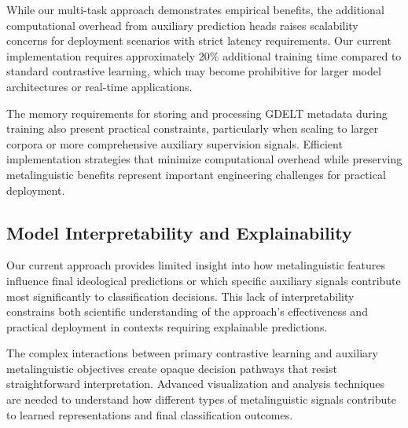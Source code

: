 While our multi-task approach demonstrates empirical benefits, the additional computational overhead from auxiliary prediction heads raises scalability concerns for deployment scenarios with strict latency requirements. Our current implementation requires approximately 20\% additional training time compared to standard contrastive learning, which may become prohibitive for larger model architectures or real-time applications.

The memory requirements for storing and processing GDELT metadata during training also present practical constraints, particularly when scaling to larger corpora or more comprehensive auxiliary supervision signals. Efficient implementation strategies that minimize computational overhead while preserving metalinguistic benefits represent important engineering challenges for practical deployment.

\subsection{Model Interpretability and Explainability}

Our current approach provides limited insight into how metalinguistic features influence final ideological predictions or which specific auxiliary signals contribute most significantly to classification decisions. This lack of interpretability constrains both scientific understanding of the approach's effectiveness and practical deployment in contexts requiring explainable predictions.

The complex interactions between primary contrastive learning and auxiliary metalinguistic objectives create opaque decision pathways that resist straightforward interpretation. Advanced visualization and analysis techniques are needed to understand how different types of metalinguistic signals contribute to learned representations and final classification outcomes.
